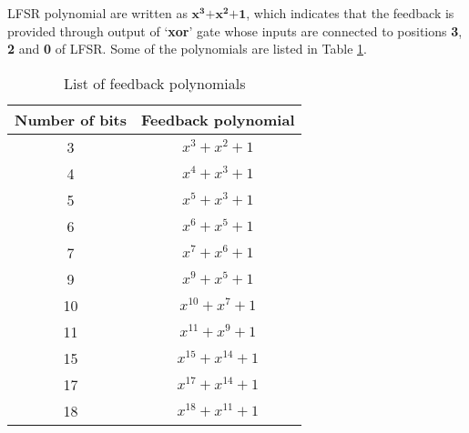 LFSR polynomial are written as \textbf{${{\mathbf{x}}^{\mathbf{3}}}{\mathbf{ + }}{{\mathbf{x}}^{\mathbf{2}}}{\mathbf{ + 1}}$}, which indicates that the feedback is provided through output of `\textbf{xor}' gate whose  inputs are connected to positions \textbf{3}, \textbf{2} and \textbf{0} of LFSR. Some of the polynomials are listed in Table \ref{tbl:polynomial}.


\begin{table}[!h]
	\centering
	\caption{List of feedback polynomials}
	\label{tbl:polynomial}
	\begin{tabular} {|c |c |}
		\hline
		\textbf{Number of bits} & \textbf{Feedback polynomial} \\ \hline
		3    & ${x^3} + {x^2} + 1$ \\ \hline
		4    & ${x^4} + {x^3} + 1$ \\ \hline
		5    & ${x^5} + {x^3} + 1$ \\ \hline
		6    & ${x^6} + {x^5} + 1$ \\ \hline
		7    & ${x^7} + {x^6} + 1$ \\ \hline
		9    & ${x^9} + {x^5} + 1$ \\ \hline
		10   & ${x^{10}} + {x^7} + 1$ \\ \hline
		11   & ${x^{11}} + {x^9} + 1$ \\ \hline
		15   & ${x^{15}} + {x^{14}} + 1$ \\ \hline
		17   & ${x^{17}} + {x^{14}} + 1$ \\ \hline
		18   & ${x^{18}} + {x^{11}} + 1$ \\ \hline
	\end{tabular}
\end{table}

